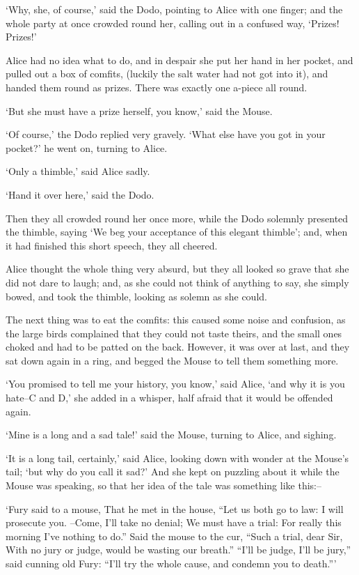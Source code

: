 \documentclass[statementpaper,twoside,openany]{memoir}
\begin{document}
`Why, she, of course,' said the Dodo, pointing to Alice with one finger; and the whole party at once crowded round her, calling out in a confused way, `Prizes! Prizes!'

Alice had no idea what to do, and in despair she put her hand in her pocket, and pulled out a box of comfits, (luckily the salt water had not got into it), and handed them round as prizes. There was exactly one a-piece all round.

`But she must have a prize herself, you know,' said the Mouse.

`Of course,' the Dodo replied very gravely. `What else have you got in your pocket?' he went on, turning to Alice.

`Only a thimble,' said Alice sadly.

`Hand it over here,' said the Dodo.

Then they all crowded round her once more, while the Dodo solemnly presented the thimble, saying `We beg your acceptance of this elegant thimble'; and, when it had finished this short speech, they all cheered.

Alice thought the whole thing very absurd, but they all looked so grave that she did not dare to laugh; and, as she could not think of anything to say, she simply bowed, and took the thimble, looking as solemn as she could.

The next thing was to eat the comfits: this caused some noise and confusion, as the large birds complained that they could not taste theirs, and the small ones choked and had to be patted on the back. However, it was over at last, and they sat down again in a ring, and begged the Mouse to tell them something more.

`You promised to tell me your history, you know,' said Alice, `and why it is you hate--C and D,' she added in a whisper, half afraid that it would be offended again.

`Mine is a long and a sad tale!' said the Mouse, turning to Alice, and sighing.

`It is a long tail, certainly,' said Alice, looking down with wonder at the Mouse's tail; `but why do you call it sad?' And she kept on puzzling about it while the Mouse was speaking, so that her idea of the tale was something like this:--

`Fury said to a mouse, That he met in the house, ``Let us both go to law: I will prosecute you. --Come, I'll take no denial; We must have a trial: For really this morning I've nothing to do.'' Said the mouse to the cur, ``Such a trial, dear Sir, With no jury or judge, would be wasting our breath.'' ``I'll be judge, I'll be jury,'' said cunning old Fury: ``I'll try the whole cause, and condemn you to death.'''
\end{document}
